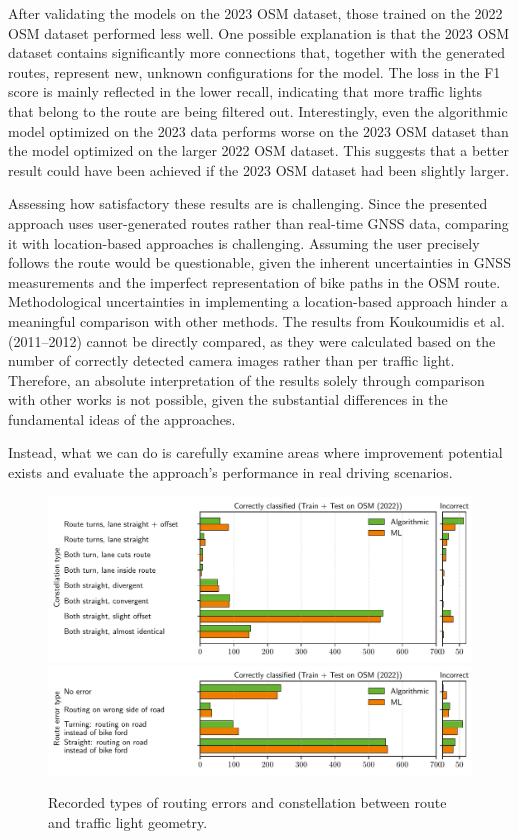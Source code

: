 After validating the models on the 2023 OSM dataset, those trained on the 2022 OSM dataset performed less well. One possible explanation is that the 2023 OSM dataset contains significantly more connections that, together with the generated routes, represent new, unknown configurations for the model. The loss in the F1 score is mainly reflected in the lower recall, indicating that more traffic lights that belong to the route are being filtered out. Interestingly, even the algorithmic model optimized on the 2023 data performs worse on the 2023 OSM dataset than the model optimized on the larger 2022 OSM dataset. This suggests that a better result could have been achieved if the 2023 OSM dataset had been slightly larger.

Assessing how satisfactory these results are is challenging. Since the presented approach uses user-generated routes rather than real-time GNSS data, comparing it with location-based approaches is challenging. Assuming the user precisely follows the route would be questionable, given the inherent uncertainties in GNSS measurements and the imperfect representation of bike paths in the OSM route. Methodological uncertainties in implementing a location-based approach hinder a meaningful comparison with other methods. The results from Koukoumidis et al. (2011–2012) \cite{koukoumidis_signalguru_2011, koukoumidis_leveraging_2012} cannot be directly compared, as they were calculated based on the number of correctly detected camera images rather than per traffic light. Therefore, an absolute interpretation of the results solely through comparison with other works is not possible, given the substantial differences in the fundamental ideas of the approaches.

Instead, what we can do is carefully examine areas where improvement potential exists and evaluate the approach's performance in real driving scenarios.

\begin{figure}[t]
\centering 
\includegraphics[width=\linewidth]{images/matching-constellations-osm-old.pdf} \\
\includegraphics[width=\linewidth]{images/matching-route-errors-osm-old.pdf}
\caption{Recorded types of routing errors and constellation between route and traffic light geometry.}
\label{fig:matching-constellations-osm}
\end{figure}

